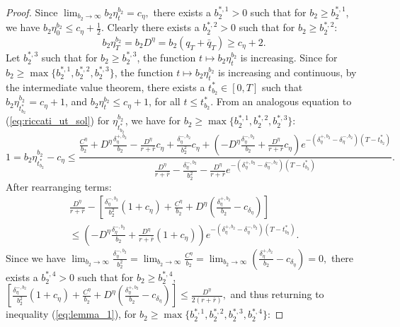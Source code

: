 \documentclass[11pt]{article}
\begin{document}
\begin{proof}
	Since $\lim_{b_2 \to \infty}b_2\eta^{b_2}_t= c_\eta,$ there exists a $b_2^{*,1}>0$ such that for $b_2 \geq b_2^{*,1}$, we have
	$b_2\eta^{b_2}_0 \leq c_\eta+\frac{1}{2}.$
	Clearly there exists a $b_2^{*,2}>0$ such that for $b_2 \geq b_2^{*,2}$:
	$$b_2\eta^{b_2}_T=b_2D^\eta=b_2(q_T+\bar{q}_T)\geq c_\eta+2.$$
	Let $b_2^{*,3}$ such that for $b_2 \geq b_2^{*,3}$, the function $t \mapsto b_2 \eta^{b_2}_t$ is increasing. Since for $b_2 \geq \max \{b_2^{*,1},b_2^{*,2},b_2^{*,3} \}$, the function $t \mapsto b_2 \eta^{b_2}_t$ is increasing and continuous, by the intermediate value theorem, there exists a $t^*_{b_2}\in[0,T]$ such that
	$b_2 \eta^{b_2}_{t^*_{b_2}} =c_\eta+1$, and $b_2 \eta^{b_2}_t \leq c_\eta+1$, for all $t\leq t^*_{b_2}.$
	From an analogous equation to (\ref{eq:riccati_ut_sol}) for $\eta^{b_2}_{t^*_{b_2}}$, we have for $b_2 \geq \max \{b_2^{*,1},b_2^{*,2},b_2^{*,3} \}$:
	$$
	1=b_2\eta^{b_2}_{t^*_{b_2}}-c_\eta\leq \frac{ \frac{C^\eta}{b_2}+D^\eta\frac{\delta^{+,b_2}_\eta}{b_2}-\frac{D^\eta}{r+\bar{r}}c_\eta +\frac{\delta^{-,b_2}_\eta}{b_2^2}c_\eta+\left(-D^\eta\frac{\delta^{-,b_2}_\eta}{b_2} +\frac{D^\eta}{r+\bar{r}}c_\eta\right)e^{-(\delta^{+,b_2}_\eta-\delta^{-,b_2}_\eta)(T-t^*_{b_2})} }{ \frac{D^\eta}{r+\bar{r}} -\frac{\delta^{-,b_2}_\eta}{b_2^2} -\frac{D^\eta}{r+\bar{r}} e^{-(\delta^{+,b_2}_\eta-\delta^{-,b_2}_\eta)(T-t^*_{b_2})}}.
	$$
	After rearranging terms:
	\begin{equation}
	\begin{split}
	\frac{D^\eta}{r+\bar{r}}-\left[\frac{\delta^{-,b_2}_\eta}{b_2^2}(1+c_\eta)+\frac{C^\eta}{b_2}+D^\eta \left(\frac{\delta^{+,b_2}_\eta}{b_2}-c_{\delta_\eta} \right)\right]\\
	\leq  \left(-D^\eta\frac{\delta^{-,b_2}_\eta }{b_2}+\frac{D^\eta}{r+\bar{r}}(1+c_\eta) \right) e^{-\left(\delta^{+,b_2}_\eta -\delta^{-,b_2}_\eta\right)(T-t^*_{b_2})}.
	\end{split}
	\label{eq:lemma_1}
	\end{equation}
	Since we have
	$\lim_{b_2 \to \infty}\frac{\delta^{-,b_2}_\eta}{b_2^2}=\lim_{b_2 \to \infty}\frac{C^\eta}{b_2}=\lim_{b_2 \to \infty}\left(\frac{\delta^{+,b_2}_\eta}{b_2}-c_{\delta_\eta} \right) =0,$ there exists a $b_2^{*,4}>0$ such that for $b_2 \geq b_2^{*,4}$,
	$\left[\frac{\delta^{-,b_2}_\eta}{b_2^2}(1+c_\eta)+\frac{C^\eta}{b_2}+D^\eta \left(\frac{\delta^{+,b_2}_\eta}{b_2}-c_{\delta_\eta} \right)\right] \leq \frac{D^\eta}{2(r+\bar{r})},$
	and thus returning to inequality (\ref{eq:lemma_1}), for $b_2 \geq \max \{b_2^{*,1},b_2^{*,2},b_2^{*,3},b_2^{*,4} \}$:

\end{proof}
\end{document}
